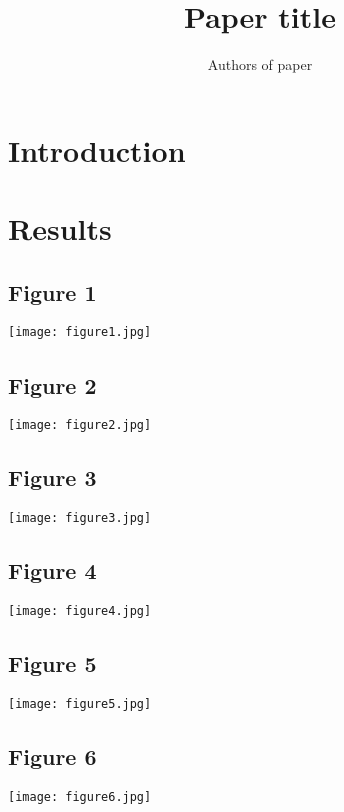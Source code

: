 \documentclass{beamer}
\title{Paper title}
\author{Authors of paper}
\date{}
\begin{document}
\begin{frame}
	\titlepage
\end{frame}

\section{Introduction}

\begin{frame}
\end{frame}

\section{Results}
\frame{\sectionpage}
	\subsection{Figure 1}
	\frame{\subsectionpage}
	\begin{frame}
		\texttt{[image: figure1.jpg]}
	\end{frame}
	
	\subsection{Figure 2}
	\frame{\subsectionpage}
	\begin{frame}
		\texttt{[image: figure2.jpg]}
	\end{frame}
	
	\subsection{Figure 3}
	\frame{\subsectionpage}
	\begin{frame}
		\texttt{[image: figure3.jpg]}
	\end{frame}
	
	\subsection{Figure 4}
	\frame{\subsectionpage}
	\begin{frame}
		\texttt{[image: figure4.jpg]}
	\end{frame}
	
	\subsection{Figure 5}
	\frame{\subsectionpage}
	\begin{frame}
		\texttt{[image: figure5.jpg]}
	\end{frame}
	
	\subsection{Figure 6}
	\frame{\subsectionpage}
	\begin{frame}
		\texttt{[image: figure6.jpg]}
	\end{frame}
		
	
\end{document}
